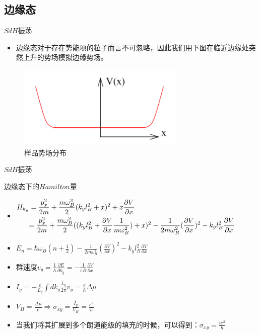\documentclass{beamer}
\begin{document}
\subsection{边缘态}
\begin{frame}{$SdH$振荡}
\begin{itemize}
	\item 边缘态对于存在势能项的粒子而言不可忽略，因此我们用下图在临近边缘处突然上升的势场模拟边缘势场。
\end{itemize}
	\begin{figure}[H]
		\begin{center}
			\includegraphics[width=8cm,height=4cm]{pic/3.png}
			\caption{样品势场分布\cite{meng2018integer}}
		\end{center}
	\end{figure}
\end{frame}
\begin{frame}{$SdH$振荡}
	\begin{block}{边缘态下的$Hamilton$量}
		\begin{itemize}
			\item{\small  $\begin{aligned}
				H_{k_{y}}&=\dfrac{p_{x}^{2}}{2m}+\dfrac{m\omega_{B}^{2}}{2}(k_{y}l_{B}^{2}+x)^{2}+x\dfrac{\partial V}{\partial x}\\
				&{\tiny =\dfrac{p_{x}^{2}}{2m}+\dfrac{m\omega_{B}^{2}}{2}((k_{y}l_{B}^{2}+\dfrac{\partial V}{\partial x}\dfrac{1}{m\omega_{B}^{2}})+x)^{2}-\dfrac{1}{2m\omega_{B}^{2}}(\dfrac{\partial V}{\partial x})^{2}-k_{y}l_{B}^{2}\dfrac{\partial V}{\partial x}}
			\end{aligned}$}
			\item $E_{n}=\hbar\omega_{B}(n+\frac{1}{2})-\frac{1}{2m\omega_{B}^{2}}(\frac{\partial V}{\partial x})^{2}-k_{y}l_{B}^{2}\frac{\partial V}{\partial x}$
			\item 群速度$v_{y}=\frac{1}{\hbar}\frac{\partial E}{\partial k_{y}}=-\frac{1}{eB}\frac{\partial V}{\partial x}$
			\item $I_{y}=-\frac{e}{L_{y}}\int dk_{y}\frac{L_{y}}{2\pi}v_{y}=\frac{e}{h}\Delta\mu$
			\item $V_{H}=\frac{\Delta \mu}{e}\Rightarrow \sigma_{xy}=\frac{I_{y}}{V_{H}}=\frac{e^{2}}{h}$
			\item 当我们将其扩展到多个朗道能级的填充的时候，可以得到：$\sigma_{xy}=\frac{ie^{2}}{h}$
		\end{itemize}
	\end{block}
\end{frame}
\end{document}
